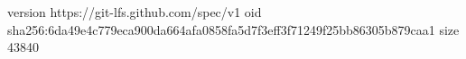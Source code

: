 version https://git-lfs.github.com/spec/v1
oid sha256:6da49e4c779eca900da664afa0858fa5d7f3eff3f71249f25bb86305b879caa1
size 43840
